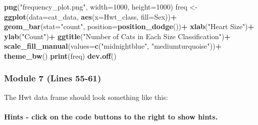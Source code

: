 \documentclass[
]{article}
\newenvironment{Shaded}{\begin{snugshade}}{\end{snugshade}}
\newcommand{\CommentTok}[1]{\textcolor[rgb]{0.56,0.35,0.01}{\textit{#1}}}
\newcommand{\DataTypeTok}[1]{\textcolor[rgb]{0.13,0.29,0.53}{#1}}
\newcommand{\DecValTok}[1]{\textcolor[rgb]{0.00,0.00,0.81}{#1}}
\newcommand{\KeywordTok}[1]{\textcolor[rgb]{0.13,0.29,0.53}{\textbf{#1}}}
\newcommand{\NormalTok}[1]{#1}
\newcommand{\OperatorTok}[1]{\textcolor[rgb]{0.81,0.36,0.00}{\textbf{#1}}}
\newcommand{\StringTok}[1]{\textcolor[rgb]{0.31,0.60,0.02}{#1}}
\begin{document}
\begin{Shaded}
\begin{Highlighting}[]
\KeywordTok{png}\NormalTok{(}\StringTok{"frequency_plot.png"}\NormalTok{, }\DataTypeTok{width=}\DecValTok{1000}\NormalTok{, }\DataTypeTok{height=}\DecValTok{1000}\NormalTok{)}
\NormalTok{freq <-}\StringTok{ }\KeywordTok{ggplot}\NormalTok{(}\DataTypeTok{data=}\NormalTok{cat_data, }\KeywordTok{aes}\NormalTok{(}\DataTypeTok{x=}\NormalTok{Hwt_class, }\DataTypeTok{fill=}\NormalTok{Sex))}\OperatorTok{+}
\StringTok{  }\KeywordTok{geom_bar}\NormalTok{(}\DataTypeTok{stat=}\StringTok{"count"}\NormalTok{, }\DataTypeTok{position=}\KeywordTok{position_dodge}\NormalTok{())}\OperatorTok{+}
\StringTok{  }\KeywordTok{xlab}\NormalTok{(}\StringTok{"Heart Size"}\NormalTok{)}\OperatorTok{+}\StringTok{ }\KeywordTok{ylab}\NormalTok{(}\StringTok{"Count"}\NormalTok{)}\OperatorTok{+}
\StringTok{  }\KeywordTok{ggtitle}\NormalTok{(}\StringTok{"Number of Cats in Each Size Classification"}\NormalTok{)}\OperatorTok{+}
\StringTok{  }\KeywordTok{scale_fill_manual}\NormalTok{(}\DataTypeTok{values=}\KeywordTok{c}\NormalTok{(}\StringTok{"midnightblue"}\NormalTok{, }\StringTok{"mediumturquoise"}\NormalTok{))}\OperatorTok{+}
\StringTok{  }\KeywordTok{theme_bw}\NormalTok{()}
\KeywordTok{print}\NormalTok{(freq)}
\KeywordTok{dev.off}\NormalTok{()}
\end{Highlighting}
\end{Shaded}

\hypertarget{module-7-lines-55-61}{%
\subsubsection{Module 7 (Lines 55-61)}\label{module-7-lines-55-61}}

The Hwt data frame should look something like this:

\hypertarget{hints---click-on-the-code-buttons-to-the-right-to-show-hints.-4}{%
\paragraph{Hints - click on the code buttons to the right to show
hints.}\label{hints---click-on-the-code-buttons-to-the-right-to-show-hints.-4}}

\begin{Shaded}
\end{Shaded}
\end{document}
